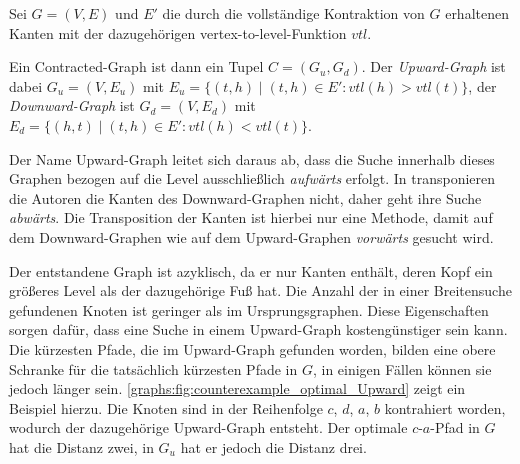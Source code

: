 \begin{definition}
  Sei $G = (V, E)$ und $E'$ die durch die vollständige Kontraktion von $G$ erhaltenen Kanten mit der dazugehörigen vertex-to-level-Funktion ${vtl}$.

  Ein Contracted-Graph ist dann ein Tupel $C = (G_u, G_d)$. Der \emph{Upward-Graph} ist dabei $G_u = (V, E_u)$ mit $E_u = \{ (t, h) \mid (t, h) \in E' \colon {vtl}(h) > {vtl}(t) \}$, der \emph{Downward-Graph} ist $G_d = (V, E_d)$ mit $E_d = \{ (h, t) \mid (t, h) \in E' \colon {vtl}(h) < {vtl}(t) \}$.
\end{definition}

Der Name Upward-Graph leitet sich daraus ab, dass die Suche innerhalb dieses Graphen bezogen auf die Level ausschließlich \emph{aufwärts} erfolgt.
In \cite{geisberger2008contraction} transponieren die Autoren die Kanten des Downward-Graphen nicht, daher geht ihre Suche \emph{abwärts}.
Die Transposition der Kanten ist hierbei nur eine Methode, damit auf dem Downward-Graphen wie auf dem Upward-Graphen \emph{vorwärts} gesucht wird.

Der entstandene Graph ist azyklisch, da er nur Kanten enthält, deren Kopf ein größeres Level als der dazugehörige Fuß hat.
Die Anzahl der in einer Breitensuche gefundenen Knoten ist geringer als im Ursprungsgraphen.
Diese Eigenschaften sorgen dafür, dass eine Suche in einem Upward-Graph kostengünstiger sein kann.
Die kürzesten Pfade, die im Upward-Graph gefunden worden, bilden eine obere Schranke für die tatsächlich kürzesten Pfade in $G$, in einigen Fällen können sie jedoch länger sein.
\autoref{graphs:fig:counterexample_optimal_Upward} zeigt ein Beispiel hierzu.
Die Knoten sind in der Reihenfolge $c$, $d$, $a$, $b$ kontrahiert worden, wodurch der dazugehörige Upward-Graph entsteht.
Der optimale $c$-$a$-Pfad in $G$ hat die Distanz zwei, in $G_u$ hat er jedoch die Distanz drei.

